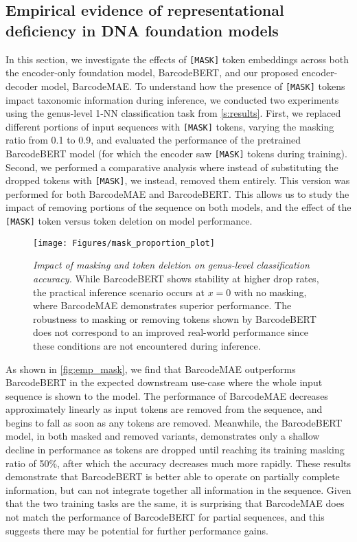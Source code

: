 \subsection{Empirical evidence of representational deficiency in DNA foundation models}

In this section, we investigate the effects of \texttt{[MASK]} token embeddings across both the encoder-only foundation model, BarcodeBERT, and our proposed encoder-decoder model, BarcodeMAE.
To understand how the presence of \texttt{[MASK]} tokens impact taxonomic information during inference, we conducted two experiments using the genus-level 1-NN classification task from \autoref{s:results}. First, we replaced different portions of input sequences with \texttt{[MASK]} tokens, varying the masking ratio from 0.1 to 0.9, and evaluated the performance of the pretrained BarcodeBERT model (for which the encoder saw \texttt{[MASK]} tokens during training). Second, we performed a comparative analysis where instead of substituting the dropped tokens with \texttt{[MASK]}, we instead, removed them entirely. This version was performed for both BarcodeMAE and BarcodeBERT.
This allows us to study the impact of removing portions of the sequence on both models, and the effect of the \texttt{[MASK]} token versus token deletion on model performance.

\begin{figure}[tbh]
    \centering
    \texttt{[image: Figures/mask\_proportion\_plot]}
    \caption{\textit{Impact of masking and token deletion on genus-level classification accuracy.} While BarcodeBERT shows stability at higher drop rates, the practical inference scenario occurs at $x\!=\!0$ with no masking, where BarcodeMAE demonstrates superior performance. The robustness to masking or removing tokens shown by BarcodeBERT does not correspond to an improved real-world performance since these conditions are not encountered during inference.}
    \label{fig:emp_mask}
\end{figure}

As shown in \autoref{fig:emp_mask}, we find that BarcodeMAE outperforms BarcodeBERT in the expected downstream use-case where the whole input sequence is shown to the model.
The performance of BarcodeMAE decreases approximately linearly as input tokens are removed from the sequence, and begins to fall as soon as any tokens are removed.
Meanwhile, the BarcodeBERT model, in both masked and removed variants, demonstrates only a shallow decline in performance as tokens are dropped until reaching its training masking ratio of 50\%, after which the accuracy decreases much more rapidly.
These results demonstrate that BarcodeBERT is better able to operate on partially complete information, but can not integrate together all information in the sequence.
Given that the two training tasks are the same, it is surprising that BarcodeMAE does not match the performance of BarcodeBERT for partial sequences, and this suggests there may be potential for further performance gains.

